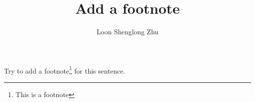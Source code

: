 \documentclass{article}
\title{Add a footnote}
\author{Loon Shenglong Zhu}
\begin{document}
\maketitle

Try to add a footnote\footnote{This is a footnote} for this sentence.
\end{document}
